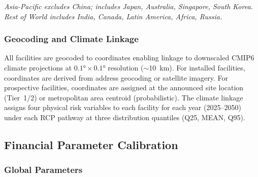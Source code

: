 \small\textit{Asia-Pacific excludes China; includes Japan, Australia, Singapore, South Korea.
Rest of World includes India, Canada, Latin America, Africa, Russia.}
\normalsize


\subsubsection{Geocoding and Climate Linkage}

All facilities are geocoded to coordinates enabling linkage to downscaled CMIP6 climate
projections at $0.1° \times 0.1°$ resolution ($\sim$10~km). For installed facilities,
coordinates are derived from address geocoding or satellite imagery. For prospective
facilities, coordinates are assigned at the announced site location (Tier~1/2) or
metropolitan area centroid (probabilistic). The climate linkage assigns four physical risk
variables to each facility for each year (2025--2050) under each RCP pathway at three
distribution quantiles (Q25, MEAN, Q95).



\subsection{Financial Parameter Calibration}
\label{app:financial}

\subsubsection{Global Parameters}

